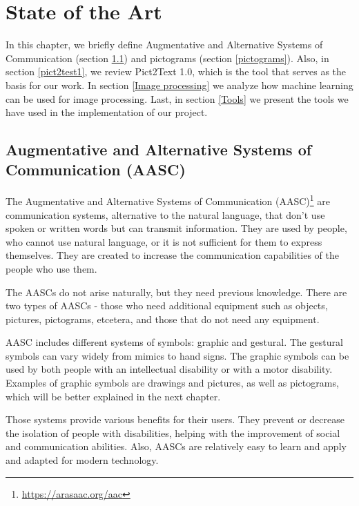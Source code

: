 
\chapter{State of the Art}
\label{State of the Art}

In this chapter, we briefly define Augmentative and Alternative Systems of Communication (section \ref{AASC}) and pictograms (section \ref{pictograms}). Also, in section \ref{pict2test1}, we review Pict2Text 1.0, which is the tool that serves as the basis for our work. In section \ref{Image processing} we analyze how machine learning can be used for image processing. Last, in section \ref{Tools} we present the tools we have used in the implementation of our project.

\section{Augmentative and Alternative Systems of Communication (AASC)}
\label{AASC}
The Augmentative and Alternative Systems of Communication (AASC)\footnote{\href{https://arasaac.org/aac}{https://arasaac.org/aac}} \citep{aacChildrenAdults} are communication systems, alternative to the natural language, that don't use spoken or written words but can transmit information. They are used by people, who cannot use natural language, or it is not sufficient for them to express themselves. They are created to increase the communication capabilities of the people who use them.

The AASCs do not arise naturally, but they need previous knowledge. There are two types of AASCs - those who need additional equipment such as objects, pictures, pictograms, etcetera, and those that do not need any equipment.

AASC includes different systems of symbols: graphic and gestural. The gestural symbols can vary widely from mimics to hand signs. The graphic symbols can be used by both people with an intellectual disability or with a motor disability. Examples of graphic symbols are drawings and pictures, as well as pictograms, which will be better explained in the next chapter.

Those systems provide various benefits for their users. They prevent or decrease the isolation of people with disabilities, helping with the improvement of social and communication abilities. Also, AASCs are relatively easy to learn and apply and adapted for modern technology.

